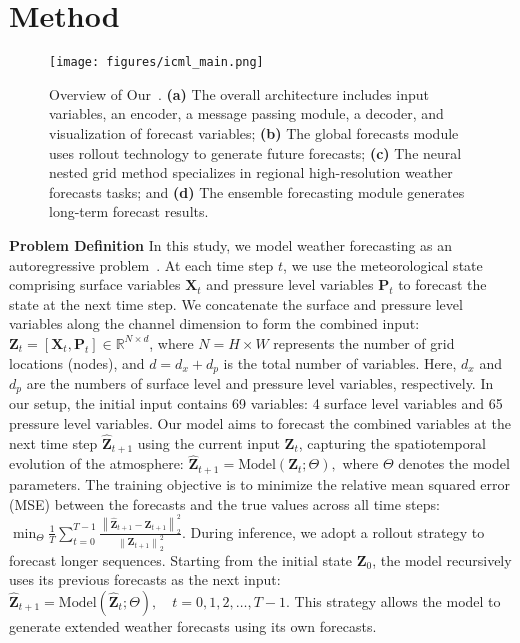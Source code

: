 \section{Method}
\begin{figure*}
  \centering
  \texttt{[image: figures/icml\_main.png]}
     \vspace{-16pt}
  \caption{Overview of Our~\method{}. \textbf{(a)} The overall architecture includes input variables, an encoder, a message passing module, a decoder, and visualization of forecast variables; \textbf{(b)} The global forecasts module uses rollout technology to generate future forecasts; \textbf{(c)} The neural nested grid method specializes in regional high-resolution weather forecasts tasks; and \textbf{(d)} The ensemble forecasting module generates long-term forecast results.}
  \label{fig:ICML_yuan}
\vspace{-10pt}
\end{figure*}

\textbf{Problem Definition}\label{sec:problem}
In this study, we model weather forecasting as an autoregressive problem~\cite{lam2023learning}. At each time step $t$, we use the meteorological state comprising surface variables $\mathbf{X}_t$ and pressure level variables $\mathbf{P}_t$ to forecast the state at the next time step. We concatenate the surface and pressure level variables along the channel dimension to form the combined input: $\mathbf{Z}_t = [\mathbf{X}_t, \mathbf{P}_t] \in \mathbb{R}^{N \times d}$, where $N = H \times W$ represents the number of grid locations (nodes), and $d = d_x + d_p$ is the total number of variables. Here, $d_x$ and $d_p$ are the numbers of surface level and pressure level variables, respectively. In our setup, the initial input contains 69 variables: 4 surface level variables and 65 pressure level variables. Our model aims to forecast the combined variables at the next time step $\hat{\mathbf{Z}}_{t+1}$ using the current input $\mathbf{Z}_t$, capturing the spatiotemporal evolution of the atmosphere: $\hat{\mathbf{Z}}_{t+1} = \text{Model}(\mathbf{Z}_t; \Theta),$ where $\Theta$ denotes the model parameters. The training objective is to minimize the relative mean squared error (MSE) between the forecasts and the true values across all time steps: $    \min_{\Theta} \frac{1}{T} \sum_{t=0}^{T-1} \frac{ \left\| \hat{\mathbf{Z}}_{t+1} - \mathbf{Z}_{t+1} \right\|_2^2}{\left\| \mathbf{Z}_{t+1} \right\|_2^2}$. During inference, we adopt a rollout strategy to forecast longer sequences. Starting from the initial state $\mathbf{Z}_0$, the model recursively uses its previous forecasts as the next input: $ \hat{\mathbf{Z}}_{t+1} = \text{Model}(\hat{\mathbf{Z}}_t; \Theta), \quad t = 0, 1, 2, \dots, T-1.$ This strategy allows the model to generate extended weather forecasts using its own forecasts.

